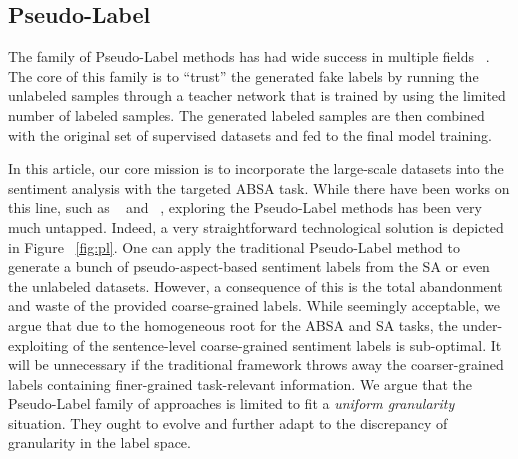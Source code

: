 \documentclass[11pt]{article}
\begin{document}
\subsection{Pseudo-Label}
The family of Pseudo-Label methods has had wide success in multiple fields ~\cite{pham2020meta,ge2020mutual,mallis2020unsupervised,zoph2020rethinking,he2019revisiting}.
The core of this family is to ``trust'' the generated fake labels by running the unlabeled samples through a teacher network that is trained by using the limited number of labeled samples.
The generated labeled samples are then combined with the original set of supervised datasets and fed to the final model training.

In this article, our core mission is to incorporate the large-scale datasets into the sentiment analysis with the targeted ABSA task.
While there have been works on this line, such as ~\citet{he2018exploiting} and ~\citet{he2019interactive}, exploring the Pseudo-Label methods has been very much untapped. Indeed, a very straightforward technological solution is depicted in Figure ~\ref{fig:pl}. 
One can apply the traditional Pseudo-Label method to generate a bunch of pseudo-aspect-based sentiment labels from the SA or even the unlabeled datasets. 
However, a consequence of this is the total abandonment and waste of the provided coarse-grained labels.
While seemingly acceptable, we argue that due to the homogeneous root for the ABSA and SA tasks, the under-exploiting of the sentence-level coarse-grained sentiment labels is sub-optimal.
It will be unnecessary if the traditional framework throws away the coarser-grained labels containing finer-grained task-relevant information.
We argue that the Pseudo-Label family of approaches is limited to fit a \emph{uniform granularity} situation. They ought to evolve and further adapt to the discrepancy of granularity in the label space.
\end{document}
